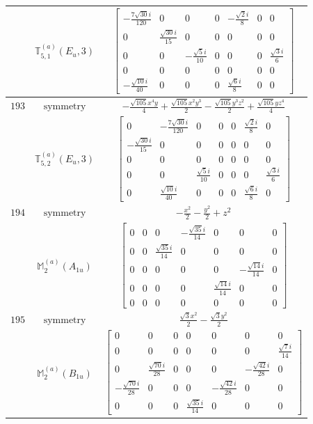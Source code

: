 \documentclass[fleqn,8pt,landscape]{jsarticle}
\begin{document}
\begin{longtable}{ccc}
$  $ & $ \mathbb{T}_{5,1}^{(a)}(E_{u},3) $ & $ \begin{bmatrix} - \frac{7 \sqrt{30} i}{120} & 0 & 0 & 0 & - \frac{\sqrt{2} i}{8} & 0 & 0 \\ 0 & \frac{\sqrt{30} i}{15} & 0 & 0 & 0 & 0 & 0 \\ 0 & 0 & - \frac{\sqrt{5} i}{10} & 0 & 0 & 0 & \frac{\sqrt{3} i}{6} \\ 0 & 0 & 0 & 0 & 0 & 0 & 0 \\ - \frac{\sqrt{10} i}{40} & 0 & 0 & 0 & \frac{\sqrt{6} i}{8} & 0 & 0 \end{bmatrix} $ \\ \hline
$ 193 $ & $ \text{symmetry} $ & $ - \frac{\sqrt{105} x^{4} y}{4} + \frac{\sqrt{105} x^{2} y^{3}}{2} - \frac{\sqrt{105} y^{3} z^{2}}{2} + \frac{\sqrt{105} y z^{4}}{4} $ \\
$  $ & $ \mathbb{T}_{5,2}^{(a)}(E_{u},3) $ & $ \begin{bmatrix} 0 & - \frac{7 \sqrt{30} i}{120} & 0 & 0 & 0 & \frac{\sqrt{2} i}{8} & 0 \\ - \frac{\sqrt{30} i}{15} & 0 & 0 & 0 & 0 & 0 & 0 \\ 0 & 0 & 0 & 0 & 0 & 0 & 0 \\ 0 & 0 & \frac{\sqrt{5} i}{10} & 0 & 0 & 0 & \frac{\sqrt{3} i}{6} \\ 0 & \frac{\sqrt{10} i}{40} & 0 & 0 & 0 & \frac{\sqrt{6} i}{8} & 0 \end{bmatrix} $ \\ \hline
$ 194 $ & $ \text{symmetry} $ & $ - \frac{x^{2}}{2} - \frac{y^{2}}{2} + z^{2} $ \\
$  $ & $ \mathbb{M}_{2}^{(a)}(A_{1u}) $ & $ \begin{bmatrix} 0 & 0 & 0 & - \frac{\sqrt{35} i}{14} & 0 & 0 & 0 \\ 0 & 0 & \frac{\sqrt{35} i}{14} & 0 & 0 & 0 & 0 \\ 0 & 0 & 0 & 0 & 0 & - \frac{\sqrt{14} i}{14} & 0 \\ 0 & 0 & 0 & 0 & \frac{\sqrt{14} i}{14} & 0 & 0 \\ 0 & 0 & 0 & 0 & 0 & 0 & 0 \end{bmatrix} $ \\ \hline
$ 195 $ & $ \text{symmetry} $ & $ \frac{\sqrt{3} x^{2}}{2} - \frac{\sqrt{3} y^{2}}{2} $ \\
$  $ & $ \mathbb{M}_{2}^{(a)}(B_{1u}) $ & $ \begin{bmatrix} 0 & 0 & 0 & 0 & 0 & 0 & 0 \\ 0 & 0 & 0 & 0 & 0 & 0 & \frac{\sqrt{7} i}{14} \\ 0 & \frac{\sqrt{70} i}{28} & 0 & 0 & 0 & - \frac{\sqrt{42} i}{28} & 0 \\ - \frac{\sqrt{70} i}{28} & 0 & 0 & 0 & - \frac{\sqrt{42} i}{28} & 0 & 0 \\ 0 & 0 & 0 & \frac{\sqrt{35} i}{14} & 0 & 0 & 0 \end{bmatrix} $ \\ \hline

\end{longtable}
\end{document}
